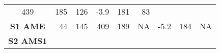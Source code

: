 \begin{longtable}[]{@{}crrrrrrrr@{}}
\begin{minipage}[t]{0.06\columnwidth}
439\strut
\end{minipage} & \begin{minipage}[t]{0.08\columnwidth}\raggedleft\strut
185\strut
\end{minipage} & \begin{minipage}[t]{0.08\columnwidth}\raggedleft\strut
126\strut
\end{minipage} & \begin{minipage}[t]{0.04\columnwidth}\raggedleft\strut
-3.9\strut
\end{minipage} & \begin{minipage}[t]{0.14\columnwidth}\raggedleft\strut
181\strut
\end{minipage} & \begin{minipage}[t]{0.14\columnwidth}\raggedleft\strut
83\strut
\end{minipage}\tabularnewline
\begin{minipage}[t]{0.09\columnwidth}\centering\strut
\textbf{S1 AME}\strut
\end{minipage} & \begin{minipage}[t]{0.09\columnwidth}\raggedleft\strut
44\strut
\end{minipage} & \begin{minipage}[t]{0.07\columnwidth}\raggedleft\strut
145\strut
\end{minipage} & \begin{minipage}[t]{0.06\columnwidth}\raggedleft\strut
409\strut
\end{minipage} & \begin{minipage}[t]{0.08\columnwidth}\raggedleft\strut
189\strut
\end{minipage} & \begin{minipage}[t]{0.08\columnwidth}\raggedleft\strut
NA\strut
\end{minipage} & \begin{minipage}[t]{0.04\columnwidth}\raggedleft\strut
-5.2\strut
\end{minipage} & \begin{minipage}[t]{0.14\columnwidth}\raggedleft\strut
184\strut
\end{minipage} & \begin{minipage}[t]{0.14\columnwidth}\raggedleft\strut
NA\strut
\end{minipage}\tabularnewline
\begin{minipage}[t]{0.09\columnwidth}\centering\strut
\textbf{S2 AMS1}\strut
\end{minipage} & \begin{minipage}[t]{0.09\columnwidth}\raggedleft\strut

\end{minipage}
\end{longtable}
